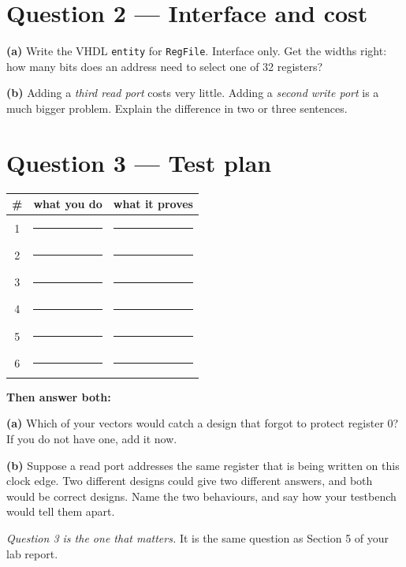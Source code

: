 \documentclass[11pt]{article}
\newcommand{\code}[1]{\texttt{#1}}
\newcommand{\answerbox}[1]{\vspace{2pt}\fbox{\parbox[c][#1][c]{\dimexpr\linewidth-2\fboxsep-2\fboxrule}{\ }}\vspace{4pt}}
\begin{document}
\answerbox{2.0cm}

\section*{Question 2 --- Interface and cost}

\textbf{(a)} Write the VHDL \code{entity} for \code{RegFile}. Interface only.
Get the widths right: how many bits does an address need to select one of 32
registers?

\answerbox{4.4cm}

\textbf{(b)} Adding a \emph{third read port} costs very little. Adding a
\emph{second write port} is a much bigger problem. Explain the difference in two
or three sentences.

\answerbox{2.2cm}

\section*{Question 3 --- Test plan}

\begin{center}
\begin{tabular}{@{}c@{\hskip 8pt}p{5.0cm}@{\hskip 8pt}p{7.6cm}@{}}
\toprule
\# & what you do & what it proves \\
\midrule
1 & \rule{4.8cm}{0.4pt} & \rule{7.4cm}{0.4pt} \\[8pt]
2 & \rule{4.8cm}{0.4pt} & \rule{7.4cm}{0.4pt} \\[8pt]
3 & \rule{4.8cm}{0.4pt} & \rule{7.4cm}{0.4pt} \\[8pt]
4 & \rule{4.8cm}{0.4pt} & \rule{7.4cm}{0.4pt} \\[8pt]
5 & \rule{4.8cm}{0.4pt} & \rule{7.4cm}{0.4pt} \\[8pt]
6 & \rule{4.8cm}{0.4pt} & \rule{7.4cm}{0.4pt} \\
\bottomrule
\end{tabular}
\end{center}

\textbf{Then answer both:}

\textbf{(a)} Which of your vectors would catch a design that forgot to protect
register 0? If you do not have one, add it now.

\answerbox{1.4cm}

\textbf{(b)} Suppose a read port addresses the same register that is being
written on this clock edge. Two different designs could give two different
answers, and both would be correct designs. Name the two behaviours, and say how
your testbench would tell them apart.

\answerbox{2.4cm}

\vfill
{\small\emph{Question 3 is the one that matters.} It is the same question as
Section 5 of your lab report.}
\end{document}
